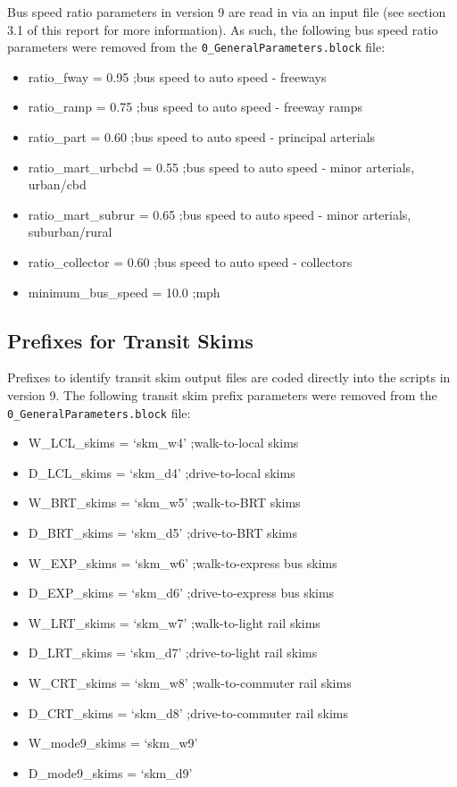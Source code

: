 \documentclass[
  letterpaper,
  DIV=11,
  numbers=noendperiod,
  titlepage=false]{scrreprt}
\providecommand{\tightlist}{%
  \setlength{\itemsep}{0pt}\setlength{\parskip}{0pt}}\usepackage{longtable,booktabs,array}
\begin{document}
Bus speed ratio parameters in version 9 are read in via an input file
(see section 3.1 of this report for more information). As such, the
following bus speed ratio parameters were removed from the
\texttt{0\_GeneralParameters.block} file:

\begin{itemize}
\tightlist
\item
  ratio\_fway = 0.95 ;bus speed to auto speed - freeways
\item
  ratio\_ramp = 0.75 ;bus speed to auto speed - freeway ramps
\item
  ratio\_part = 0.60 ;bus speed to auto speed - principal arterials
\item
  ratio\_mart\_urbcbd = 0.55 ;bus speed to auto speed - minor arterials,
  urban/cbd
\item
  ratio\_mart\_subrur = 0.65 ;bus speed to auto speed - minor arterials,
  suburban/rural
\item
  ratio\_collector = 0.60 ;bus speed to auto speed - collectors
\item
  minimum\_bus\_speed = 10.0 ;mph
\end{itemize}

\hypertarget{prefixes-for-transit-skims}{%
\subsection{Prefixes for Transit
Skims}\label{prefixes-for-transit-skims}}

Prefixes to identify transit skim output files are coded directly into
the scripts in version 9. The following transit skim prefix parameters
were removed from the \texttt{0\_GeneralParameters.block} file:

\begin{itemize}
\tightlist
\item
  W\_LCL\_skims = `skm\_w4' ;walk-to-local skims
\item
  D\_LCL\_skims = `skm\_d4' ;drive-to-local skims
\item
  W\_BRT\_skims = `skm\_w5' ;walk-to-BRT skims
\item
  D\_BRT\_skims = `skm\_d5' ;drive-to-BRT skims
\item
  W\_EXP\_skims = `skm\_w6' ;walk-to-express bus skims
\item
  D\_EXP\_skims = `skm\_d6' ;drive-to-express bus skims
\item
  W\_LRT\_skims = `skm\_w7' ;walk-to-light rail skims
\item
  D\_LRT\_skims = `skm\_d7' ;drive-to-light rail skims
\item
  W\_CRT\_skims = `skm\_w8' ;walk-to-commuter rail skims
\item
  D\_CRT\_skims = `skm\_d8' ;drive-to-commuter rail skims
\item
  W\_mode9\_skims = `skm\_w9'
\item
  D\_mode9\_skims = `skm\_d9'
\end{itemize}
\end{document}
